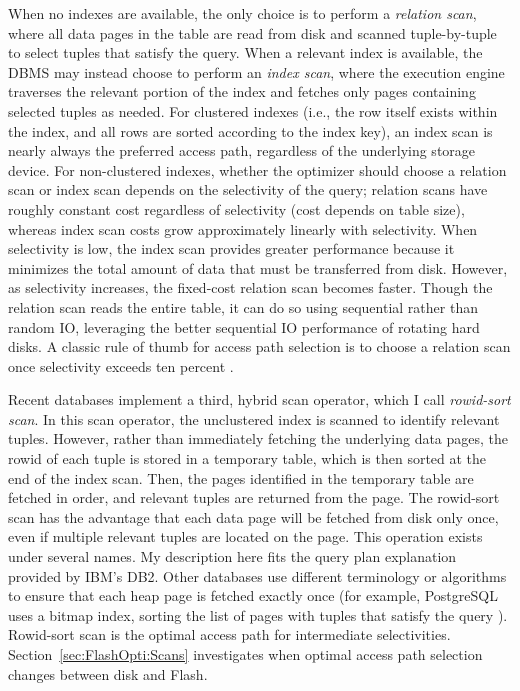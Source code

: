 When no indexes are available, the only choice is to perform a \emph{relation scan}, where all data pages in the table are read from disk and scanned tuple-by-tuple to select tuples that satisfy the query.
When a relevant index is available, the DBMS may instead choose to perform an \emph{index scan}, where the execution engine traverses the relevant portion of the index and fetches only pages containing selected tuples as needed.
For clustered indexes (i.e., the row itself exists within the index, and all rows are sorted according to the index key), an index scan is nearly always the preferred access path, regardless of the underlying storage device.  
For non-clustered indexes, whether the optimizer should choose a relation scan or index scan depends on the selectivity of the query; relation scans have roughly constant cost regardless of selectivity (cost depends on table size), whereas index scan costs grow approximately linearly with selectivity.
When selectivity is low, the index scan provides greater performance because it minimizes the total amount of data that must be transferred from disk.
However, as selectivity increases, the fixed-cost relation scan becomes faster.  
Though the relation scan reads the entire table, it can do so using sequential rather than random IO, leveraging the better sequential IO performance of rotating hard disks.
A classic rule of thumb for access path selection is to choose a relation scan once selectivity exceeds ten percent \cite{RamakrishnanAndGehrke}.

Recent databases implement a third, hybrid scan operator, which I call \emph{rowid-sort scan}.
In this scan operator, the unclustered index is scanned to identify relevant tuples.
However, rather than immediately fetching the underlying data pages, the rowid of each tuple is stored in a temporary table, which is then sorted at the end of the index scan.
Then, the pages identified in the temporary table are fetched in order, and relevant tuples are returned from the page.
The rowid-sort scan has the advantage that each data page will be fetched from disk only once, even if multiple relevant tuples are located on the page. 
This operation exists under several names.
My description here fits the query plan explanation provided by IBM's DB2.
Other databases use different terminology or algorithms to ensure that each heap page is fetched exactly once (for example, PostgreSQL uses a bitmap index, sorting the list of pages with tuples that satisfy the query \cite{PostgresLossyBitMap}).
Rowid-sort scan is the optimal access path for intermediate selectivities.
Section~\ref{sec:FlashOpti:Scans} investigates when optimal access path selection changes between disk and Flash.

